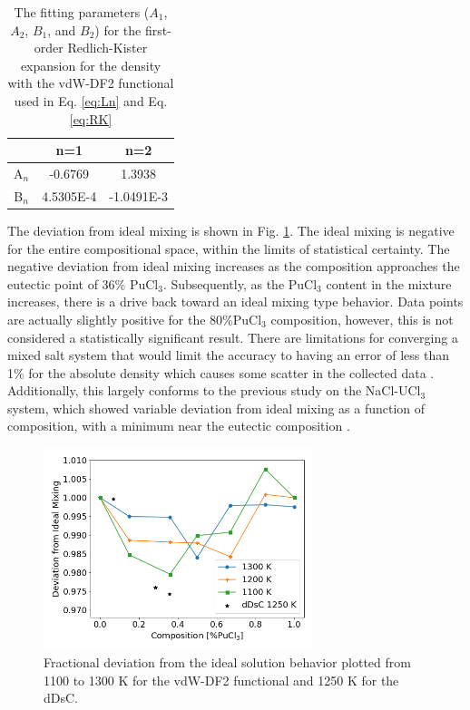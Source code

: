 \documentclass[review]{elsarticle}
\begin{document}
\begin{table}[h!]
\centering
\caption{The fitting parameters ($A_1$, $A_2$, $B_1$, and $B_2$) for the first-order Redlich-Kister expansion for the density with the vdW-DF2 functional used in Eq. \ref{eq:Ln} and Eq. \ref{eq:RK}}
\begin{tabular}{|c|c|c|}
\hline
  & n=1           & n=2           \\
\hline
A$_n$ & -0.6769 & 1.3938  \\
B$_n$ & 4.5305E-4  & -1.0491E-3 \\
\hline
\end{tabular}
\label{Table:RK_fit}
\end{table}

The deviation from ideal mixing is shown in Fig. \ref{fig:deviation}. The ideal mixing is negative for the entire compositional space, within the limits of statistical certainty. The negative deviation from ideal mixing increases as the composition approaches the eutectic point of 36\% PuCl$_3$. Subsequently, as the PuCl$_3$ content in the mixture increases, there is a drive back toward an ideal mixing type behavior. Data points are actually slightly positive for the 80\%PuCl$_3$ composition, however, this is not considered a statistically significant result. There are limitations for converging a mixed salt system that would limit the accuracy to having an error of less than 1\% for the absolute density which causes some scatter in the collected data \cite{ANDERSSON2022153836}. Additionally, this largely conforms to the previous study on the NaCl-UCl$_3$ system, which showed variable deviation from ideal mixing as a function of composition, with a minimum near the eutectic composition \cite{ANDERSSON2022153836}. 

\begin{figure}[h!]
 \centering
 \includegraphics[width=0.7\textwidth]{Diviation_from_ideal_mixing.png} 
 \caption{Fractional deviation from the ideal solution behavior plotted from 1100 to 1300 K for the vdW-DF2 functional and 1250 K for the dDsC.}
 \label{fig:deviation}
\end{figure}
\end{document}
